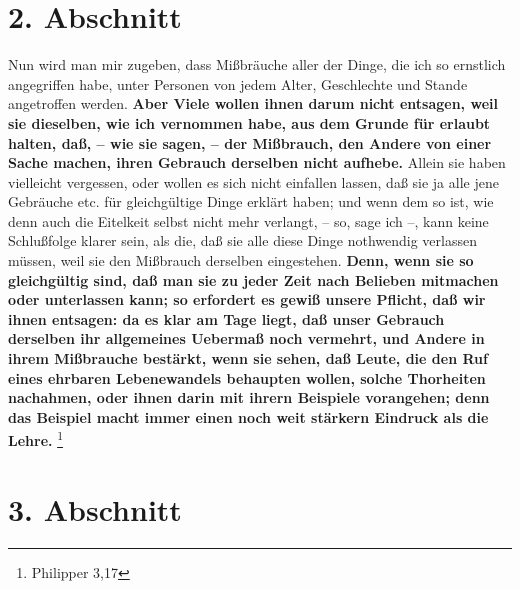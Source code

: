 \section{2. Abschnitt} \label{kap18_ab2}

Nun wird man mir zugeben, dass Mißbräuche aller der Dinge, die ich so ernstlich
angegriffen habe, unter Personen von jedem Alter, Geschlechte und Stande
angetroffen werden. \label{ref:18_02_einwand}\textbf{Aber Viele wollen ihnen darum nicht entsagen, weil
sie
dieselben, wie ich vernommen habe, aus dem Grunde für erlaubt halten, daß, --
wie sie sagen, -- der Mißbrauch, den Andere von einer Sache  machen, ihren
Gebrauch derselben nicht aufhebe.} Allein sie haben vielleicht vergessen, oder
wollen es sich nicht einfallen lassen, daß sie ja alle jene Gebräuche etc. für
gleichgültige Dinge erklärt haben; und wenn dem so ist, wie denn auch die
Eitelkeit selbst nicht mehr verlangt, -- so, sage ich --, kann keine Schlußfolge
klarer sein, als die, daß sie alle diese Dinge nothwendig verlassen müssen, weil
sie den Mißbrauch derselben eingestehen. \textbf{Denn, wenn sie so gleichgültig
sind,
daß man sie zu jeder Zeit nach Belieben mitmachen oder unterlassen kann; so
erfordert es gewiß unsere Pflicht, daß wir ihnen entsagen: da es klar am Tage
liegt, daß unser Gebrauch derselben ihr allgemeines Uebermaß noch vermehrt, und
Andere in ihrem Mißbrauche bestärkt, wenn sie sehen, daß Leute, die den Ruf
eines ehrbaren Lebenewandels behaupten wollen, solche Thorheiten nachahmen, oder
ihnen darin mit ihrern Beispiele vorangehen; denn das Beispiel macht immer einen
noch weit stärkern Eindruck als die Lehre.}
\footnote{Philipper 3,17}

\section{3. Abschnitt} \label{kap18_ab3}

